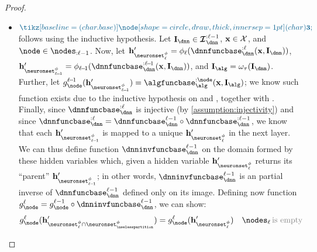 \begin{proof}
\begin{itemize}
\begin{subequations}
\begin{align}
                & \mathcomment{inductive hypothesis on }\inductioncircle{2}
            \end{align}
        \end{subequations}
        This shows $\inductioncircle{2}$ holds for layer $\layer$ when $\nodes_{\layer}$ is empty.
        \item $\inductioncircle{3}$ follows using the inductive hypothesis. 
        Let $\interventionsdnn \in \interventionsset^{:\layer-1}_{\dnn}$, $\mathbf{x} \in \mathcal{X}$, and $\node \in \nodes_{:\layer-1}$.
        Now, let $\hiddenstates'_{\neuronset^{\causalmap}_{\layer}} = \causalmap_{\layer}(\dnnfunclayer{:\layer}(\bx, \interventionsdnn))$, $\hiddenstates'_{\neuronset^{\causalmap}_{\layer\!-\!1}} = \causalmap_{\layer\!-\!1}(\dnnfunclayer{:\layer\!-\!1}(\bx, \interventionsdnn))$, and $\interventionsalg = \interventionmap(\interventionsdnn)$.
        Further, let $g_{\node}^{\layer\!-\!1}(\hiddenstates'_{\neuronset^{\causalmap}_{\layer\!-\!1}}) = \algfuncnode{:\node}(\bx, \interventionsalg)$; we know such function exists due to the inductive hypothesis on  and , together with .
        Finally, since $\dnnfunclayer{:\layer}$ is injective (by \cref{assumption:injectivity}) and since $\dnnfunclayer{:\layer} = \dnnfunclayer{\layer-1} \circ \dnnfunclayer{:\layer-1}$, we know that each $\hiddenstates'_{\neuronset^{\causalmap}_{\layer\!-\!1}}$ is mapped to a unique $\hiddenstates'_{\neuronset^{\causalmap}_{\layer}}$ in the next layer.
        We can thus define function $\dnninvfunclayer{\layer-1}$ on the domain formed by these hidden variables which, given a hidden variable $\hiddenstates'_{\neuronset^{\causalmap}_{\layer}}$ returns its ``parent'' $\hiddenstates'_{\neuronset^{\causalmap}_{\layer\!-\!1}}$; in other words, $\dnninvfunclayer{\layer-1}$ is an partial inverse of $\dnnfunclayer{\layer-1}$ defined only on its image.
        Defining now function $g_{\node}^{\layer} = g_{\node}^{\layer-1}\circ\dnninvfunclayer{\layer-1}$, we can show:
        \begin{subequations}
        \begin{align}
            g_{\node}^{\layer}(\hiddenstates'_{\neuronset^{\causalmap}_{\layer} \cap \neuronset^{\causalmap}_{\uselesspartition}}) 
            &= g_{\node}^{\layer}(\hiddenstates'_{\neuronset^{\causalmap}_{\layer}}) 
            & \nodes_{\layer}\,\mathcomment{is empty}\\

\end{align}
\end{subequations}
\end{itemize}
\end{proof}

